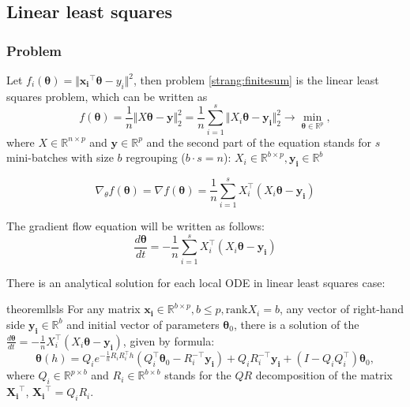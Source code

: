 \documentclass{article}
\newcommand{\vect}[1]{\boldsymbol{\mathbf{#1}}}
\begin{document}
\subsection{Linear least squares}
\subsubsection{Problem}
Let $f_i(\vect{\theta}) = \Vert \vect{x_i}^{\top} \vect{\theta} - y_i \Vert^2$, then problem \eqref{strang:finitesum} is the linear least squares problem, which can be written as
\begin{equation}\label{strang:LLS_app}
   f(\vect{\theta}) = \frac{1}{n}\Vert X \vect{\theta} - \vect{y} \Vert_2^2  = \frac{1}{n}\sum\limits_{i=1}^s\Vert X_i \vect{\theta} - \vect{y_i} \Vert_2^2\to \min_{\vect{\theta} \in \mathbb{R}^p},
\end{equation}
where $X \in \mathbb{R}^{n \times p}$ and $\vect{y} \in \mathbb{R}^p$ and the second part of the equation stands for $s$ mini-batches with size $b$ regrouping ($b \cdot s = n$): $X_i \in \mathbb{R}^{b \times p}, \vect{y_i} \in \mathbb{R}^{b}$

\begin{equation}\label{strang:LLS_grad}
\nabla_\theta f(\vect{\theta}) = \nabla f(\vect{\theta}) = \frac{1}{n}\sum\limits_{i=1}^s X_i^\top(X_i \vect{\theta} - \vect{y_i})
\end{equation}

The gradient flow equation will be written as follows:
\begin{equation}\label{strang:LLS_GF}
\frac{d \vect{\theta}}{d t} = - \frac{1}{n}\sum\limits_{i=1}^s X_i^\top( X_i \vect{\theta} - \vect{y_i})
\end{equation}

There is an analytical solution for each local ODE in linear least squares case:

\begin{restatable}{theorem}{llsls}\label{strang:LLS_local_solution} For any matrix $\vect{x_i} \in \mathbb{R}^{b \times p}, b \leq p, \text{rank}X_i = b$, any vector of right-hand side $\vect{y_i} \in \mathbb{R}^{b}$ and initial vector of parameters $\vect{\theta}_0$, there is a solution of the $\frac{d \vect{\theta}}{d t} = - \frac{1}{n} X_i^\top( X_i \vect{\theta} - \vect{y_i})$, given by formula:
\begin{equation}\label{strang:LLS_local_solution_formula}
\vect{\theta}(h) = Q_i e^{-\frac{1}{n}R_iR_i^\top h} \left( Q_i^\top \vect{\theta}_0 - R_i^{-\top}\vect{y_i}\right) + Q_iR_i^{-\top}\vect{y_i} + (I - Q_iQ_i^\top)\vect{\theta}_0,
\end{equation}
where $Q_i \in \mathbb{R}^{p \times b}$ and $R_i \in \mathbb{R}^{b \times b}$ stands for the $QR$ decomposition of the matrix $\vect{X_i}^\top$, $\vect{X_i}^\top = Q_i R_i$.
\end{restatable}
\end{document}

